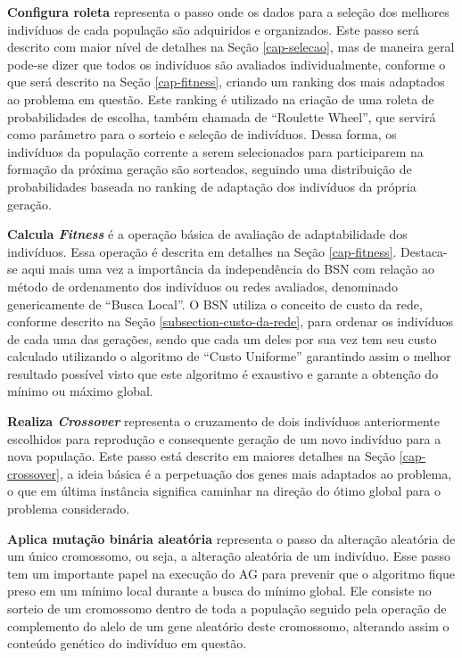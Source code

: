 \textbf{Configura roleta} representa o passo onde os dados para a seleção dos melhores indivíduos de cada população são adquiridos e organizados. Este passo será descrito com maior nível de detalhes na Seção \ref{cap-selecao}, mas de maneira geral pode-se dizer que todos os indivíduos são avaliados individualmente, conforme o que será descrito na Seção \ref{cap-fitness}, criando um ranking dos mais adaptados ao problema em questão. Este ranking é utilizado na criação de uma roleta de probabilidades de escolha, também chamada de ``Roulette Wheel'', que servirá como parâmetro para o sorteio e seleção de indivíduos. Dessa forma, os indivíduos da população corrente a serem selecionados para participarem na formação da próxima geração são sorteados, seguindo uma distribuição de probabilidades baseada no ranking de adaptação dos indivíduos da própria geração.

\textbf{Calcula \emph{Fitness}} é a operação básica de avaliação de adaptabilidade dos indivíduos. Essa operação é descrita em detalhes na Seção \ref{cap-fitness}. Destaca-se aqui mais uma vez a importância da independência do BSN com relação ao método de ordenamento dos indivíduos ou redes avaliados, denominado genericamente de ``Busca Local''. O BSN utiliza o conceito de custo da rede, conforme descrito na Seção \ref{subsection-custo-da-rede}, para ordenar os indivíduos de cada uma das gerações, sendo que cada um deles por sua vez tem seu custo calculado utilizando o algoritmo de ``Custo Uniforme'' garantindo assim o melhor resultado possível visto que este algoritmo é exaustivo e garante a obtenção do mínimo ou máximo global.

\textbf{Realiza \emph{Crossover}} representa o cruzamento de dois indivíduos anteriormente escolhidos para reprodução e consequente geração de um novo indivíduo para a nova população. Este passo está descrito em maiores detalhes na Seção \ref{cap-crossover}, a ideia básica é a perpetuação dos genes mais adaptados ao problema, o que em última instância significa caminhar na direção do ótimo global para o problema considerado.

\textbf{Aplica mutação binária aleatória} representa o passo da alteração aleatória de um único cromossomo, ou seja, a alteração aleatória de um indivíduo. Esse passo tem um importante papel na execução do AG para prevenir que o algoritmo fique preso em um mínimo local durante a busca do mínimo global. Ele consiste no sorteio de um cromossomo dentro de toda a população seguido pela operação de complemento do alelo de um gene aleatório deste cromossomo, alterando assim o conteúdo genético do indivíduo em questão. 

